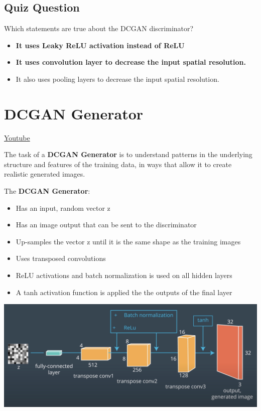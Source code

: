 \subsection{Quiz Question}
Which statements are true about the DCGAN discriminator?
\begin{itemize}
    \item \textbf{It uses Leaky ReLU activation instead of ReLU}
    \item \textbf{It uses convolution layer to decrease the input spatial resolution.}
    \item It also uses pooling layers to decrease the input spatial resolution.
\end{itemize}


\section{DCGAN Generator}
\href{https://www.youtube.com/watch?v=L_YXK_UPDmc}{Youtube} \newline

The task of a \textbf{DCGAN Generator} is to understand patterns in the underlying structure and features of the training data, in ways that allow it to create realistic generated images. \newline

The \textbf{DCGAN Generator}:

\begin{itemize}
    \item Has an input, random vector z
    \item Has an image output that can be sent to the discriminator
    \item Up-samples the vector z until it is the same shape as the training images
    \item Uses transposed convolutions
    \item ReLU activations and batch normalization is used on all hidden layers
    \item A tanh activation function is applied the the outputs of the final layer
\end{itemize}

\includegraphics[width=1\linewidth]{img//genAdvNet//deepGAN/screen-shot-2022-05-10-at-10.26.17-am.jpeg}


